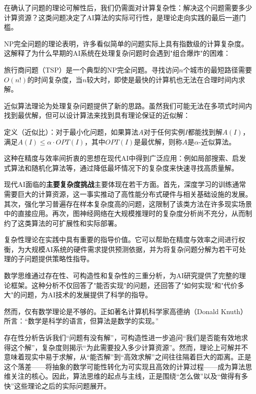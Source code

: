 在确认了问题的理论可解性后，我们仍需面对计算复杂性：解决这个问题需要多少计算资源？这类问题决定了AI算法的实际可行性，是理论走向实践的最后一道门槛。

NP完全问题的理论表明，许多看似简单的问题实际上具有指数级的计算复杂度。这解释了为什么早期的AI系统在处理复杂问题时会遇到"组合爆炸"的困难：

\begin{example}
旅行商问题（TSP）是一个典型的NP完全问题。寻找访问$n$个城市的最短路径需要$O(n!)$的时间复杂度，当$n$较大时，即使是最快的计算机也无法在合理时间内求解。
\end{example}

近似算法理论为处理复杂问题提供了新的思路。虽然我们可能无法在多项式时间内找到最优解，但可以设计算法来找到具有理论保证的近似解：

定义（近似比）：对于最小化问题，如果算法$A$对于任何实例$I$都能找到解$A(I)$，满足$A(I) \leq \alpha \cdot OPT(I)$，其中$OPT(I)$是最优解，则称$A$是$\alpha$-近似算法。

这种在精度与效率间折衷的思想在现代AI中得到广泛应用：例如局部搜索、启发式算法和随机化算法等，通过降低最坏情况下的复杂度来快速寻找高质量解。

现代AI面临的\textbf{主要复杂度挑战}主要体现在若干方面。首先，深度学习的训练通常需要巨大的计算资源，这一事实推动了高性能分布式硬件与相关基础设施的发展。其次，强化学习普遍存在样本复杂度高的问题，这限制了该类方法在许多现实场景中的直接应用。再次，图神经网络在大规模推理时的复杂度分析尚不充分，从而制约了这类算法的可扩展性和实际部署。

复杂性理论在实践中具有重要的指导价值。它可以帮助在精度与效率之间进行权衡，为大规模AI系统的硬件需求提供预测依据，并为将复杂问题分解为若干可处理的子问题提供策略性指导。

数学思维通过存在性、可构造性和复杂性的三重分析，为AI研究提供了完整的理论框架。这种分析不仅回答了"能否实现"的问题，还回答了"如何实现"和"代价多大"的问题，为AI技术的发展提供了科学的指导。

然而，仅有数学理论是不够的。正如著名计算机科学家高德纳（Donald Knuth）所言：“数学是科学的语言，但算法是数学的实现。”

存在性分析告诉我们“问题有没有解”，可构造性进一步追问“我们是否能有效地求得这个解”，复杂度则揭示“为此需要投入多少计算资源”。然而，理论上可解并不意味着现实中易于求解，从“能否解”到“高效求解”之间往往隔着巨大的距离。正是这个落差——将抽象的数学可能性转化为可实现且高效的计算过程——成为算法思维关注的核心。因此，算法思维的起点与主线，正是围绕“怎么做”以及“做得有多快”这些理论之后的实际问题展开。

